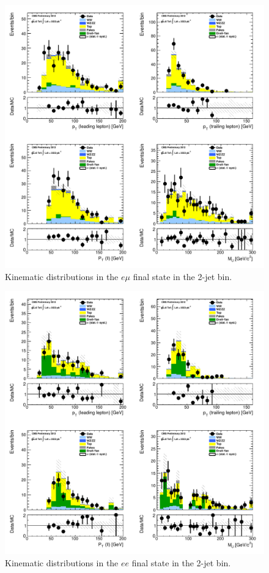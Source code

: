 \begin{figure}[!hbtp]
\centering
\includegraphics[width=1\textwidth]{figures/ww_analysis20_0_ALL_em_2j.pdf} %
\caption{Kinematic distributions in the $e\mu$ final state in the 2-jet bin.}
\label{fig:xs_kinematics_em_2j}
\end{figure}
\begin{figure}[!hbtp]
\centering
\includegraphics[width=1\textwidth]{figures/ww_analysis20_0_ALL_ee_2j.pdf} %
\caption{Kinematic distributions in the $ee$ final state in the 2-jet bin.}
\label{fig:xs_kinematics_ee_2j}
\end{figure}
